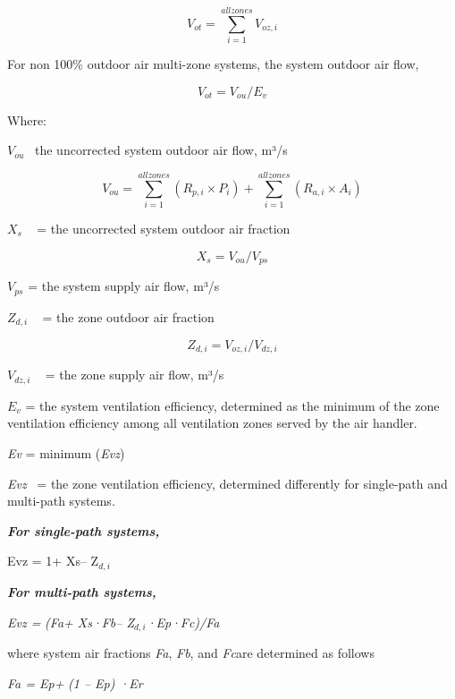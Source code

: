 \begin{equation}
{V_{ot}} = \mathop \sum \limits_{i = 1}^{allzones} {V_{oz,i}}
\end{equation}

For non 100\% outdoor air multi-zone systems, the system outdoor air flow,

\begin{equation}
{V_{ot}} = {V_{ou}}/{E_v}
\end{equation}

Where:

\({V_{ou}}\) ~the uncorrected system outdoor air flow, m³/s

\begin{equation}
{V_{ou}} = \mathop \sum \limits_{i = 1}^{allzones} ({R_{p,i}} \times {P_i}) + \mathop \sum \limits_{i = 1}^{allzones} ({R_{a,i}} \times {A_i})
\end{equation}

\({X_s}\) ~ = the uncorrected system outdoor air fraction

\begin{equation}
{X_s} = {V_{ou}}/{V_{ps}}
\end{equation}

\({V_{ps}}\) = the system supply air flow, m³/s

\({Z_{d,i}}\) ~ = the zone outdoor air fraction

\begin{equation}
{Z_{d,i}} = {V_{oz,i}}/{V_{dz,i}}
\end{equation}

\({V_{dz,i}}\) ~ = the zone supply air flow, m³/s

\({E_v}\) = the system ventilation efficiency, determined as the minimum of the zone ventilation efficiency among all ventilation zones served by the air handler.

\emph{Ev} = minimum (\emph{Evz})

\emph{Evz}~ = the zone ventilation efficiency, determined differently for single-path and multi-path systems.

\textbf{\emph{For single-path systems,}}

Evz = 1+ Xs-- Z\(_{d,i}\)

\textbf{\emph{For multi-path systems,}}

\emph{Evz =} \emph{(Fa+ Xs·Fb-- Z\(_{d,i}\)·Ep·Fc)/Fa}

where system air fractions \emph{Fa}, \emph{Fb}, and \emph{Fc}are determined as follows

\emph{Fa = Ep+} \emph{(1 -- Ep) ·Er}

